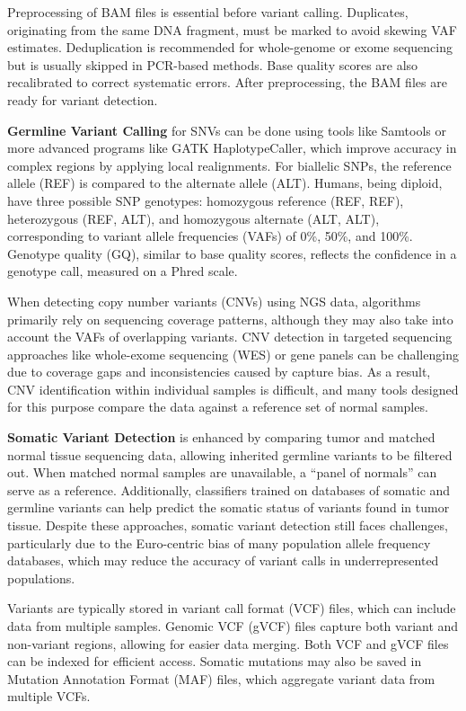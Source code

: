 Preprocessing of BAM files is essential before variant calling. Duplicates, originating from the same DNA fragment, must be marked to avoid skewing VAF estimates. Deduplication is recommended for whole-genome or exome sequencing but is usually skipped in PCR-based methods. Base quality scores are also recalibrated to correct systematic errors. After preprocessing, the BAM files are ready for variant detection. \cite{Larson2023}

\textbf{Germline Variant Calling} for SNVs can be done using tools like Samtools or more advanced programs like GATK HaplotypeCaller, which improve accuracy in complex regions by applying local realignments. For biallelic SNPs, the reference allele (REF) is compared to the alternate allele (ALT). Humans, being diploid, have three possible SNP genotypes: homozygous reference (REF, REF), heterozygous (REF, ALT), and homozygous alternate (ALT, ALT), corresponding to variant allele frequencies (VAFs) of 0\%, 50\%, and 100\%. Genotype quality (GQ), similar to base quality scores, reflects the confidence in a genotype call, measured on a Phred scale. \cite{Larson2023}

When detecting copy number variants (CNVs) using NGS data, algorithms primarily rely on sequencing coverage patterns, although they may also take into account the VAFs of overlapping variants. CNV detection in targeted sequencing approaches like whole-exome sequencing (WES) or gene panels can be challenging due to coverage gaps and inconsistencies caused by capture bias. As a result, CNV identification within individual samples is difficult, and many tools designed for this purpose compare the data against a reference set of normal samples. \cite{Larson2023}

\textbf{Somatic Variant Detection} is enhanced by comparing tumor and matched normal tissue sequencing data, allowing inherited germline variants to be filtered out. When matched normal samples are unavailable, a “panel of normals” can serve as a reference. Additionally, classifiers trained on databases of somatic and germline variants can help predict the somatic status of variants found in tumor tissue. Despite these approaches, somatic variant detection still faces challenges, particularly due to the Euro-centric bias of many population allele frequency databases, which may reduce the accuracy of variant calls in underrepresented populations. \cite{Larson2023}

Variants are typically stored in variant call format (VCF) files, which can include data from multiple samples. Genomic VCF (gVCF) files capture both variant and non-variant regions, allowing for easier data merging. Both VCF and gVCF files can be indexed for efficient access. Somatic mutations may also be saved in Mutation Annotation Format (MAF) files, which aggregate variant data from multiple VCFs. \cite{Larson2023}

